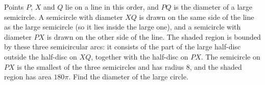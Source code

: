 Points $P$, $X$ and $Q$ lie on a line in this order, and $PQ$ is the diameter of a large semicircle. A semicircle with diameter $XQ$ is drawn on the same side of the line as the large semicircle (so it lies inside the large one), and a semicircle with diameter $PX$ is drawn on the other side of the line. The shaded region is bounded by these three semicircular arcs: it consists of the part of the large half-disc outside the half-disc on $XQ$, together with the half-disc on $PX$. The semicircle on $PX$ is the smallest of the three semicircles and has radius $8$, and the shaded region has area $180\pi$. Find the diameter of the large circle.
